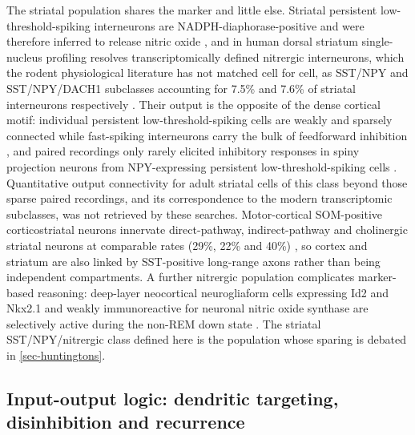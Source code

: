 \documentclass[11pt]{article}
\begin{document}
The striatal population shares the marker and little else. Striatal persistent low-threshold-spiking interneurons are NADPH-diaphorase-positive and were therefore inferred to release nitric oxide \citep{Kawaguchi1993}, and in human dorsal striatum single-nucleus profiling resolves transcriptomically defined nitrergic interneurons, which the rodent physiological literature has not matched cell for cell, as SST/NPY and SST/NPY/DACH1 subclasses accounting for 7.5\% and 7.6\% of striatal interneurons respectively \citep{Garma2024}. Their output is the opposite of the dense cortical motif: individual persistent low-threshold-spiking cells are weakly and sparsely connected while fast-spiking interneurons carry the bulk of feedforward inhibition \citep{Gittis2010}, and paired recordings only rarely elicited inhibitory responses in spiny projection neurons from NPY-expressing persistent low-threshold-spiking cells \citep{IbanezSandoval2011}. Quantitative output connectivity for adult striatal cells of this class beyond those sparse paired recordings, and its correspondence to the modern transcriptomic subclasses, was not retrieved by these searches. Motor-cortical SOM-positive corticostriatal neurons innervate direct-pathway, indirect-pathway and cholinergic striatal neurons at comparable rates (29\%, 22\% and 40\%) \citep{Melzer2017}, so cortex and striatum are also linked by SST-positive long-range axons rather than being independent compartments. A further nitrergic population complicates marker-based reasoning: deep-layer neocortical neurogliaform cells expressing Id2 and Nkx2.1 and weakly immunoreactive for neuronal nitric oxide synthase are selectively active during the non-REM down state \citep{Valero2021}. The striatal SST/NPY/nitrergic class defined here is the population whose sparing is debated in \ref{sec-huntingtons}.

\subsection{Input-output logic: dendritic targeting, disinhibition and recurrence}
\label{sec-02-input-output}
\end{document}
